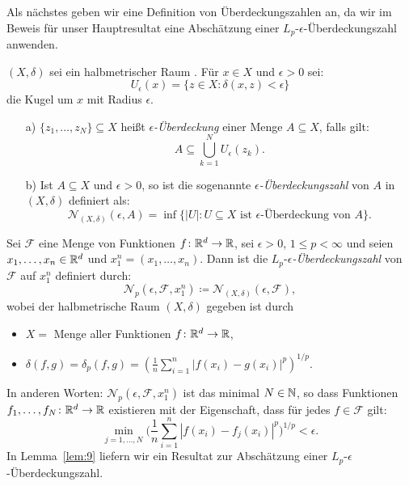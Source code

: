 Als nächstes geben wir eine Definition von Überdeckungszahlen an, da wir im Beweis für unser Hauptresultat eine Abschätzung einer $L_p\text{-}\epsilon$-Überdeckungszahl anwenden.
\begin{defn}
\label{ueberdeckung}
$(X, \delta)$ sei ein halbmetrischer Raum \cite{forster2016} . Für $x \in X$ und $\epsilon > 0$ sei:
$$U_{\epsilon}(x) = \{z \in X : \delta(x, z) < \epsilon\}$$
die Kugel um $x$ mit Radius $\epsilon$.
\begin{itemize}
\item[a)] $\{z_1,\dots,z_N\} \subseteq X$ heißt $\epsilon$\textit{-Überdeckung} einer Menge $A \subseteq X$, falls gilt:
$$A \subseteq \bigcup_{k = 1}^N U_{\epsilon}(z_k).$$
\item[b)] Ist $A \subseteq X$ und $\epsilon > 0$, so ist die sogenannte $\epsilon$\textit{-Überdeckungszahl} von $A$ in $(X,\delta)$ definiert als:
$$\mathcal{N}_{(X,\delta)}(\epsilon, A) = \inf\big\{|U| : U \subseteq X \text{ ist } \epsilon\text{-Überdeckung von } A\big\}.$$   
\end{itemize}
\end{defn} 
\begin{defn}
\label{lpe}
Sei $\mathcal{F}$ eine Menge von Funktionen $f\colon \mathbb{R}^d \to \mathbb{R}$, sei $\epsilon > 0$, $1 \leq p < \infty$ und seien $x_1,\dots,x_n \in \mathbb{R}^d$ und $x_1^n = (x_1,\dots,x_n).$ Dann ist die $L_p$-$\epsilon$\textit{-Überdeckungszahl} von $\mathcal{F}$ auf $x_1^n$ definiert durch:
$$\mathcal{N}_p(\epsilon, \mathcal{F}, x_1^n) \coloneqq \mathcal{N}_{(X,\delta)}(\epsilon, \mathcal{F}),$$
wobei der halbmetrische Raum $(X, \delta)$ gegeben ist durch
\begin{itemize}
\item $X = $ Menge aller Funktionen $f\colon \mathbb{R}^d \to \mathbb{R}$,
\item $\delta(f, g) = \delta_p(f, g) = (\frac{1}{n}\sum_{i = 1}^n |f(x_i) - g(x_i)|^p)^{1/p} .$
\end{itemize}
\end{defn}
In anderen Worten: $\mathcal{N}_p(\epsilon, \mathcal{F}, x_1^n)$ ist das minimal $N \in \mathbb{N}$, so dass Funktionen $f_1,\dots,f_N\colon \mathbb{R}^d \to \mathbb{R}$ existieren mit der Eigenschaft, dass für jedes $f \in \mathcal{F}$ gilt:
$$\min_{j = 1,\dots,N}\bigg(\frac{1}{n}\sum_{i = 1}^n|f(x_i) - f_j(x_i)|^p\bigg)^{1/p} < \epsilon.$$
In Lemma~\ref{lem:9} liefern wir ein Resultat zur Abschätzung einer $L_p$-$\epsilon$-Überdeckungszahl.

